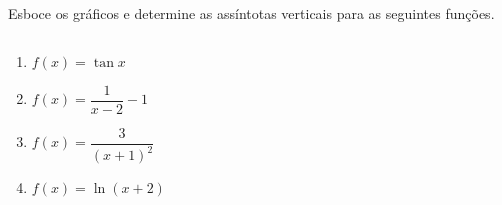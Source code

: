 \begin{frame}
  \begin{example}
    Esboce os gráficos e determine as assíntotas verticais para as seguintes funções.
  \end{example}
  \begin{columns}[onlytextwidth]
    \begin{column}{0.3\textwidth}
      \begin{enumerate}
        \item<only@1-2> $f(x) = \tan{x}$
        \item<only@3-4> $f(x) = \dfrac{1}{x-2} - 1$
        \item<only@5-6> $f(x) = \dfrac{3}{(x+1)^{2}}$
        \item<only@7-8> $f(x) = \ln{(x+2)}$
      \end{enumerate}
    \end{column}
    \begin{column}{0.7\textwidth}\vspace{-0.5cm}
      \begin{figure}
      \end{figure}
    \end{column}
  \end{columns}
\end{frame}
